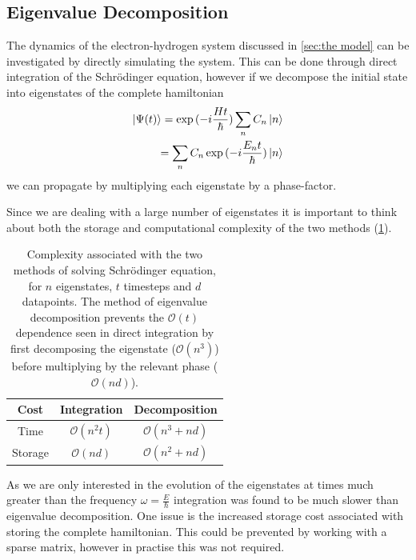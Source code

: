 \subsection{Eigenvalue Decomposition}
The dynamics of the electron-hydrogen
system discussed in \cref{sec:the model}
can be investigated by
directly simulating the system.
This can be done through direct
integration of the
Schrödinger equation, however
if we decompose
the initial state
into eigenstates
of the complete hamiltonian\cite{conduit}
\begin{align}
    \ket{\Psi(t)} = \exp{(-i\frac{Ht}{\hbar})} \sum_n C_n \ket{n} \\
    = \sum_n C_n \exp{(-i\frac{E_n t}{\hbar})} \ket{n}
\end{align}
we can propagate
by multiplying each eigenstate
by a phase-factor.

Since we are dealing with a
large number of eigenstates
it is important to think
about both the storage
and computational complexity
of the two methods (\cref{tab:algorithm complexity}).
\begin{table}[htbp]
    \begin{center}
        \begin{tabular}{ *{3}{c} }
            \toprule
            Cost    & Integration            & Decomposition              \\
            \midrule
            Time    & \(\mathcal{O}(n^2 t)\) & \(\mathcal{O}(n^3 + n d)\) \\
            Storage & \(\mathcal{O}(n d)\)   & \(\mathcal{O}(n^2 + n d)\) \\
            \bottomrule
        \end{tabular}
    \end{center}
    \caption{Complexity associated with the
        two methods of solving Schrödinger equation,
        for \(n\) eigenstates, \(t\)
        timesteps and \(d\) datapoints. The method
        of eigenvalue decomposition
        prevents the \(\mathcal{O}(t)\)
        dependence seen
        in direct integration
        by first decomposing the
        eigenstate (\(\mathcal{O}(n^3)\))
        before multiplying
        by the relevant phase
        (\(\mathcal{O}(nd)\)).
    }\label{tab:algorithm complexity}
\end{table}

As we
are only interested in the
evolution of the eigenstates
at times much greater than
the frequency
\(\omega = \frac{E}{\hbar}\)
integration
was found to be much
slower than eigenvalue
decomposition. One
issue is the increased storage
cost associated with storing
the complete
hamiltonian. This could
be prevented by
working with a sparse
matrix, however in
practise this
was not required.


